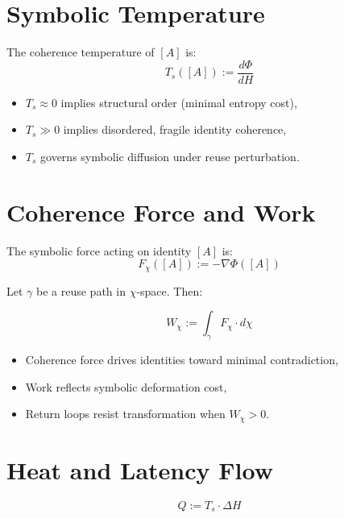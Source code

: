 \section{Symbolic Temperature} \label{sec:symbolic-temperature}

\begin{definition}
The coherence temperature of $[A]$ is:
\[
T_s([A]) := \frac{d\Phi}{dH}
\]
\end{definition}

\begin{itemize}
  \item $T_s \approx 0$ implies structural order (minimal entropy cost),
  \item $T_s \gg 0$ implies disordered, fragile identity coherence,
  \item $T_s$ governs symbolic diffusion under reuse perturbation.
\end{itemize}

\section{Coherence Force and Work} \label{sec:coherence-force}

\begin{definition}
The symbolic force acting on identity $[A]$ is:
\[
F_\chi([A]) := -\nabla\Phi([A])
\]
\end{definition}

Let $\gamma$ be a reuse path in $\chi$-space. Then:

\begin{definition}
\[
W_\chi := \int_\gamma F_\chi \cdot d\chi
\]
\end{definition}

\begin{itemize}
  \item Coherence force drives identities toward minimal contradiction,
  \item Work reflects symbolic deformation cost,
  \item Return loops resist transformation when $W_\chi > 0$.
\end{itemize}

\section{Heat and Latency Flow} \label{sec:heat-flow}

\begin{definition}
\[
Q := T_s \cdot \Delta H
\]
\end{definition}

